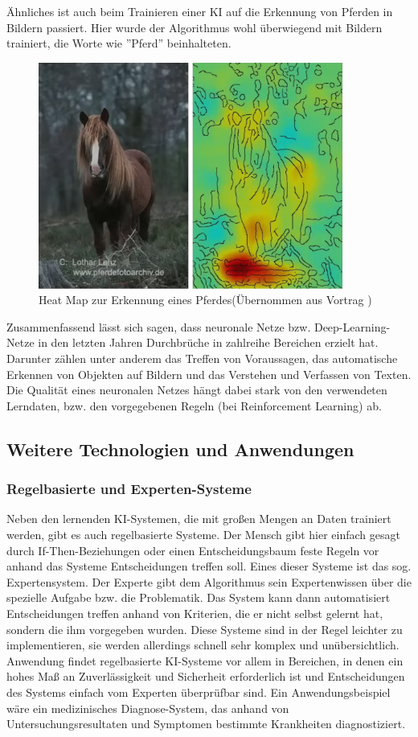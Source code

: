 \documentclass[a4paper,12pt, german]{report}
\begin{document}
Ähnliches ist auch beim Trainieren einer KI auf die Erkennung von Pferden in Bildern passiert. Hier wurde der Algorithmus wohl überwiegend mit Bildern trainiert, die Worte wie ''Pferd'' beinhalteten.

\begin{figure}[H]
  \center
 \includegraphics[width=10cm]{images/Pferd-HeatMap.png}
  \caption[Heat Map zur Erkennung eines Pferdes]{Heat Map zur Erkennung eines Pferdes(Übernommen aus Vortrag \cite{16})}
\end{figure}

Zusammenfassend lässt sich sagen, dass neuronale Netze bzw. Deep-Learning-Netze in den letzten Jahren Durchbrüche in zahlreihe Bereichen erzielt hat. Darunter zählen unter anderem das Treffen von Voraussagen, das automatische Erkennen von Objekten auf Bildern und das Verstehen und Verfassen von Texten. Die Qualität eines neuronalen Netzes hängt dabei stark von den verwendeten Lerndaten, bzw. den vorgegebenen Regeln (bei Reinforcement Learning) ab. 

\subsection{Weitere Technologien und Anwendungen}

\subsubsection{Regelbasierte und Experten-Systeme}

Neben den lernenden KI-Systemen, die mit großen Mengen an Daten trainiert werden, gibt es auch regelbasierte Systeme. Der Mensch gibt hier einfach gesagt durch If-Then-Beziehungen oder einen Entscheidungsbaum feste Regeln vor anhand das Systeme Entscheidungen treffen soll. Eines dieser Systeme ist das sog. Expertensystem. Der Experte gibt dem Algorithmus sein Expertenwissen über die spezielle Aufgabe bzw. die Problematik. Das System kann dann automatisiert Entscheidungen treffen anhand von Kriterien, die er nicht selbst gelernt hat, sondern die ihm vorgegeben wurden. Diese Systeme sind in der Regel leichter zu implementieren, sie werden allerdings schnell sehr komplex und unübersichtlich.
Anwendung findet regelbasierte KI-Systeme vor allem in Bereichen, in denen ein hohes Maß an Zuverlässigkeit und Sicherheit erforderlich ist und Entscheidungen des Systems einfach vom Experten überprüfbar sind. 
Ein Anwendungsbeispiel wäre ein medizinisches Diagnose-System, das anhand von Untersuchungsresultaten und Symptomen bestimmte Krankheiten diagnostiziert.
\end{document}
